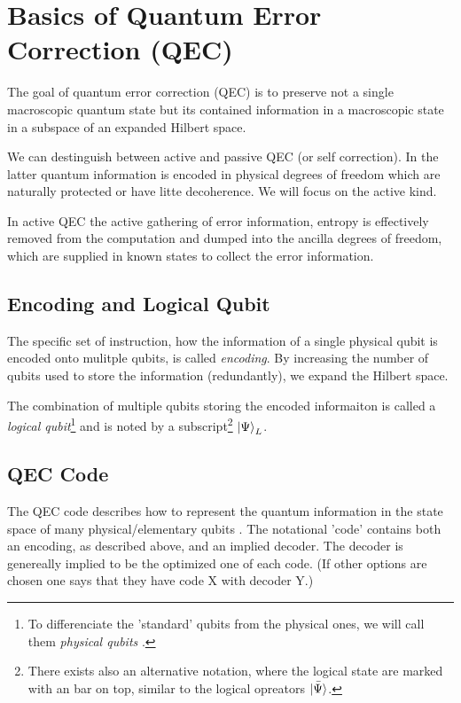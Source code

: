 \section{Basics of Quantum Error Correction (QEC)}
The goal of quantum error correction (QEC) is to preserve not a single macroscopic quantum state 
but its contained information in a macroscopic state in a subspace of an expanded Hilbert space. \cite{QECmemory}

We can destinguish between active and passive QEC (or self correction).
In the latter quantum information is encoded in physical degrees of freedom 
which are naturally protected or have litte decoherence. \cite{QECmemory}
We will focus on the active kind.

In active QEC the active gathering of error information, 
entropy is effectively removed from the computation and dumped into the ancilla degrees of freedom, 
which are supplied in known states to collect the error information. \cite{QECmemory}


\subsection{Encoding and Logical Qubit}
The specific set of instruction, 
how the information of a single physical qubit is encoded onto mulitple qubits, 
is called \textit{encoding}.
By increasing the number of qubits used to store the information (redundantly), 
we expand the Hilbert space. \cite{QECintro}

The combination of multiple qubits storing the encoded informaiton is called a \textit{logical qubit}\footnote{
    To differenciate the 'standard' qubits from the physical ones, we will call them \textit{physical qubits
    }.} 
and is noted by a subscript\footnote{
    There exists also an alternative notation, where the logical state are marked with an bar on top, 
    similar to the logical opreators $\bar{\ket{\Psi}}$. 
}
 $\ket{\Psi}_L$.


\subsection{QEC Code}
The QEC code describes how to represent the quantum information in the state space 
of many physical/elementary qubits \cite{QECmemory}.
The notational 'code' contains both an encoding, as described above, and an implied decoder.
The decoder is genereally implied to be the optimized one of each code. 
(If other options are chosen one says that they have code X with decoder Y.)


